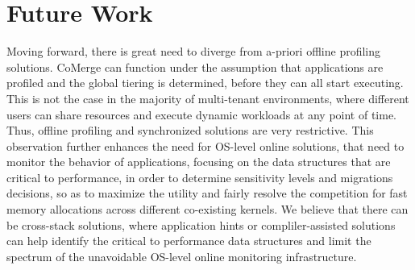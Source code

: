 \section{Future Work}

Moving forward, there is great need to diverge from a-priori offline profiling solutions. CoMerge can function under the assumption that 
applications are profiled and the global tiering is determined, before they can all start executing. This is not the case in the majority of multi-tenant environments, where different users can share resources and 
execute dynamic workloads at any point of time. Thus, offline profiling and synchronized solutions are very restrictive. This observation further enhances the need for OS-level online solutions, that need to monitor the behavior of 
applications, focusing on the data structures that are critical to performance, in order to determine sensitivity levels and migrations decisions, so as to maximize the utility and fairly resolve the competition for fast memory allocations 
across different co-existing kernels. We believe that there can be cross-stack solutions, where application hints or compliler-assisted solutions can help identify the critical to performance data structures and limit the 
spectrum of the unavoidable OS-level online monitoring infrastructure. 